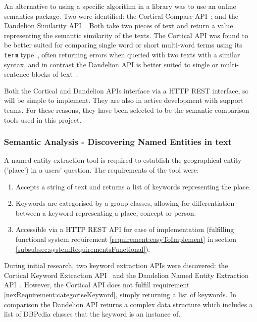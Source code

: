 \documentclass[authoryearcitations]{UoYCSproject}
\begin{document}
An alternative to using a specific algorithm in a library was to use an online semantics package. Two were identified: the Cortical Compare API~\cite{serviceCorticalSim}; and the Dandelion Similarity API~\cite{serviceDandelionSim}. Both take two pieces of text and return a value representing the semantic similarity of the texts. The Cortical API was found to be better suited for comparing single word or short multi-word terms using its \texttt{term} type~\cite{serviceCorticalSim}, often returning errors when queried with two texts with a similar syntax, and in contrast the Dandelion API is better suited to single or multi-sentence blocks of text~\cite{dandelionSim}.

Both the Cortical and Dandelion APIs interface via a HTTP REST interface, so will be simple to implement. They are also in active development with support teams. For these reasons, they have been selected to be the semantic comparison tools used in this project.

\subsubsection{Semantic Analysis - Discovering Named Entities in text}
\label{sec:choosingNamedEntityExtractionApi}

A named entity extraction tool is required to establish the geographical entity ('place') in a users' question. The requirements of the tool were:
\begin{enumerate}
  \item Accepts a string of text and returns a list of keywords representing the place.
  \item \label{nexRequirement:categoriseKeyword} Keywords are categorised by a group classes, allowing for differentiation between a keyword representing a place, concept or person.
  \item Accessible via a HTTP REST API for ease of implementation (fulfilling functional system requirement \ref{requirement:easyToImplement} in section \ref{subsubsec:systemRequirementsFunctional}).
\end{enumerate}

During initial research, two keyword extraction APIs were discovered: the Cortical Keyword Extraction API~\cite{serviceCorticalNex} and the Dandelion Named Entity Extraction API~\cite{serviceDandelionNex}. However, the Cortical API does not fulfill requirement \ref{nexRequirement:categoriseKeyword}, simply returning a list of keywords. In comparison the Dandelion API returns a complex data structure which includes a list of DBPedia classes that the keyword is an instance of.
\end{document}
